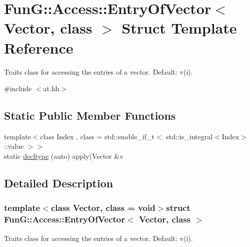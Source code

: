 \hypertarget{structFunG_1_1Access_1_1EntryOfVector}{\section{\-Fun\-G\-:\-:\-Access\-:\-:\-Entry\-Of\-Vector$<$ \-Vector, class $>$ \-Struct \-Template \-Reference}
\label{structFunG_1_1Access_1_1EntryOfVector}
}


\-Traits class for accessing the entries of a vector. \-Default\-: v(i).  




{\ttfamily \#include $<$at.\-hh$>$}

\subsection*{\-Static \-Public \-Member \-Functions}
\begin{DoxyCompactItemize}
\item 
{\footnotesize template$<$class Index , class  = std\-::enable\-\_\-if\-\_\-t$<$ std\-::is\-\_\-integral$<$\-Index$>$\-::value $>$$>$ }\\static \hyperlink{structFunG_1_1Access_1_1EntryOfVector_a98e885cf492a7555d4a428e54b0a2632}{decltype} (auto) apply(\-Vector \&v
\end{DoxyCompactItemize}


\subsection{\-Detailed \-Description}
\subsubsection*{template$<$class Vector, class = void$>$struct Fun\-G\-::\-Access\-::\-Entry\-Of\-Vector$<$ Vector, class $>$}

\-Traits class for accessing the entries of a vector. \-Default\-: v(i). 

